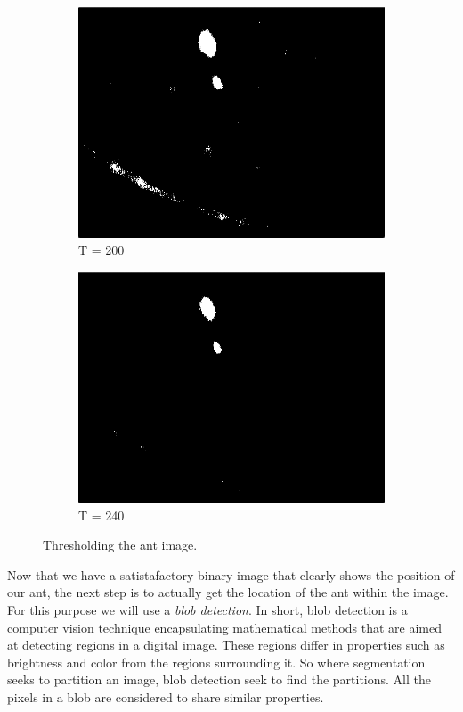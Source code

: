 \begin{figure}
\begin{subfigure}[b]{0.4\textwidth}
                \includegraphics[scale = 0.2]{img/thresh200}
                \caption{T = 200}
        \end{subfigure}
		\quad
        \begin{subfigure}[b]{0.4\textwidth}
                \includegraphics[scale = 0.2]{img/thresh240}
                \caption{T = 240}
        \end{subfigure}
		\caption{Thresholding the ant image.}
		\label{fig:thresh_ant}
\end{figure}

Now that we have a satistafactory binary image that clearly shows the position of our ant, the next step is to actually get the location of the ant within the image. For this purpose we will use a \textit{blob detection}. In short, blob detection is a computer vision technique encapsulating mathematical methods that are aimed at detecting regions in a digital image. These regions differ in properties such as brightness and color from the regions surrounding it. So where segmentation seeks to partition an image, blob detection seek to find the partitions. All the pixels in a blob are considered to share similar properties.

